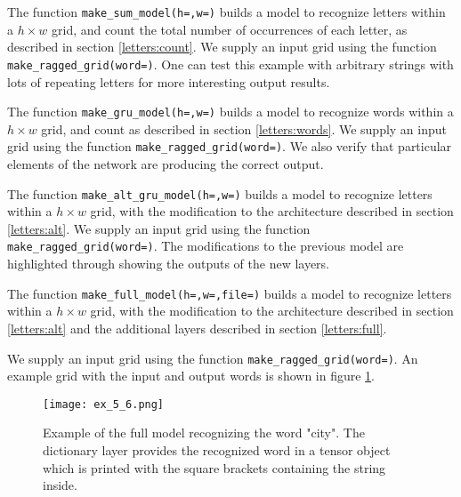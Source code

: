 \documentclass{somasmsc}
\begin{document}
\begin{exa}
The function \verb|make_sum_model(h=,w=)| builds a model to recognize letters within a $h \times w$ grid, and count the total number of occurrences of each letter, as described in section \ref{letters:count}. We supply an input grid using the function \verb|make_ragged_grid(word=)|. One can test this example with arbitrary strings with lots of repeating letters for more interesting output results.
\end{exa}

\begin{exa}
The function \verb|make_gru_model(h=,w=)| builds a model to recognize words within a $h \times w$ grid, and count as described in section \ref{letters:words}. We supply an input grid using the function \verb|make_ragged_grid(word=)|. We also verify that particular elements of the network are producing the correct output.
\end{exa}

\begin{exa}
The function \verb|make_alt_gru_model(h=,w=)| builds a model to recognize letters within a $h \times w$ grid, with the modification to the architecture described in section \ref{letters:alt}. We supply an input grid using the function \verb|make_ragged_grid(word=)|. The modifications to the previous model are highlighted through showing the outputs of the new layers.
\end{exa}

\begin{exa}
The function \verb|make_full_model(h=,w=,file=)| builds a model to recognize letters within a $h \times w$ grid, with the modification to the architecture described in section \ref{letters:alt} and the additional layers described in section \ref{letters:full}. 

We supply an input grid using the function \verb|make_ragged_grid(word=)|. An example grid with the input and output words is shown in figure \ref{letters:ex_5_6}.

\begin{figure}[H]\label{letters:ex_5_6}
\begin{center}
\texttt{[image: ex\_5\_6.png]}
\end{center}
\caption{Example of the full model recognizing the word "city". The dictionary layer provides the recognized word in a tensor object which is printed with the square brackets containing the string inside.}
\end{figure}
\end{exa}
\end{document}
